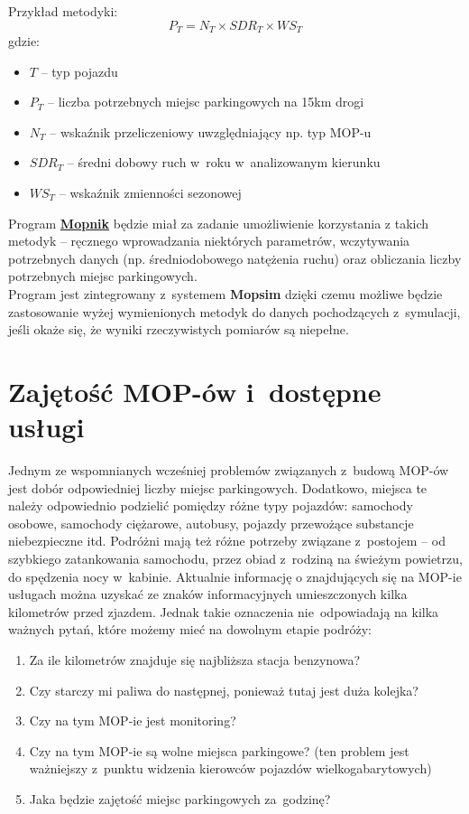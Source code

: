 Przykład metodyki: 
$$ P_T = N_T \times SDR_T \times WS_T $$
gdzie:
\begin{itemize}
  \item $T$ -- typ pojazdu
  \item $P_T$ -- liczba potrzebnych miejsc parkingowych na 15km drogi
  \item $N_T$ -- wskaźnik przeliczeniowy uwzględniający np. typ MOP-u
  \item $SDR_T$ -- średni dobowy ruch w~roku w~analizowanym kierunku 
  \item $WS_T$ -- wskaźnik zmienności sezonowej
\end{itemize}
Program \hyperref[r:mopnik]{\textbf{Mopnik}} będzie miał za zadanie umożliwienie korzystania z
takich metodyk -- ręcznego wprowadzania niektórych parametrów,
wczytywania potrzebnych danych (np. średniodobowego natężenia ruchu)
oraz obliczania liczby potrzebnych miejsc parkingowych. \\
Program jest zintegrowany z~systemem \textbf{Mopsim} dzięki
czemu możliwe będzie zastosowanie wyżej wymienionych metodyk do danych
pochodzących z~symulacji, jeśli okaże się, że wyniki rzeczywistych pomiarów są
niepełne. 


\section{Zajętość MOP-ów i~dostępne usługi}

Jednym ze wspomnianych wcześniej problemów związanych z~budową MOP-ów jest dobór odpowiedniej liczby miejsc parkingowych. Dodatkowo, miejsca te należy odpowiednio podzielić pomiędzy różne typy pojazdów: samochody osobowe, samochody ciężarowe, autobusy, pojazdy przewożące substancje niebezpieczne itd. Podróżni mają też różne potrzeby związane z~postojem -- od szybkiego zatankowania samochodu, przez obiad z~rodziną na świeżym powietrzu, do spędzenia nocy w~kabinie. \newline Aktualnie informację o znajdujących się na MOP-ie usługach można uzyskać ze znaków informacyjnych umieszczonych kilka kilometrów przed zjazdem. Jednak takie oznaczenia nie~odpowiadają na kilka ważnych pytań, które możemy mieć na dowolnym etapie podróży:
\begin{enumerate}
	\item Za ile kilometrów znajduje się najbliższa stacja benzynowa? 
	\item Czy starczy mi paliwa do następnej, ponieważ tutaj jest duża kolejka?
	\item Czy na tym MOP-ie jest monitoring?
	\item Czy na tym MOP-ie są wolne miejsca parkingowe? (ten problem jest ważniejszy z~punktu widzenia kierowców pojazdów wielkogabarytowych)
	\item Jaka będzie zajętość miejsc parkingowych za~godzinę?
\end{enumerate}

